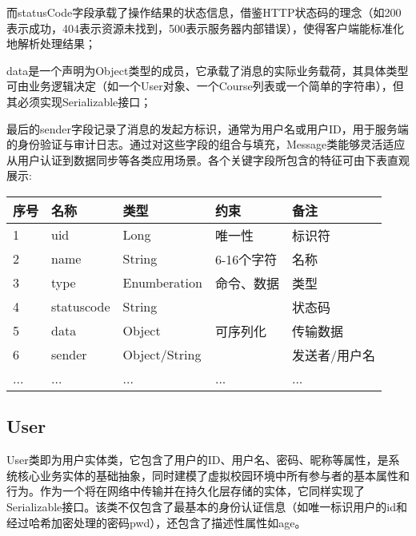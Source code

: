 \documentclass[a4paper]{ctexart}
\begin{document}
而statusCode字段承载了操作结果的状态信息，借鉴HTTP状态码的理念（如200表示成功，404表示资源未找到，500表示服务器内部错误），使得客户端能标准化地解析处理结果；

data是一个声明为Object类型的成员，它承载了消息的实际业务载荷，其具体类型可由业务逻辑决定（如一个User对象、一个Course列表或一个简单的字符串），但其必须实现Serializable接口；

最后的sender字段记录了消息的发起方标识，通常为用户名或用户ID，用于服务端的身份验证与审计日志。通过对这些字段的组合与填充，Message类能够灵活适应从用户认证到数据同步等各类应用场景。各个关键字段所包含的特征可由下表直观展示:

\begin{tabular}{lllll}
    \toprule
    \textbf{序号} & \textbf{名称} & \textbf{类型}    & \textbf{约束}            & \textbf{备注} \\
    \midrule
    1           & uid           & Long           & 唯一性        &标识符\\
    2           & name          & String         & 6-16个字符    &名称  \\
    3           & type          & Enumberation   & 命令、数据     &类型 \\
    4           & statuscode    & String         &               &状态码           \\
    5           & data          & Object         & 可序列化       &传输数据   \\
    6           & sender        & Object/String  &               &发送者/用户名\\
    ...         & ...           & ...            &...            &...\\
    \bottomrule
\end{tabular}


\subsection{User}
User类即为用户实体类，它包含了用户的ID、用户名、密码、昵称等属性，是系统核心业务实体的基础抽象，同时建模了虚拟校园环境中所有参与者的基本属性和行为。作为一个将在网络中传输并在持久化层存储的实体，它同样实现了Serializable接口。该类不仅包含了最基本的身份认证信息（如唯一标识用户的id和经过哈希加密处理的密码pwd），还包含了描述性属性如age。
\end{document}
